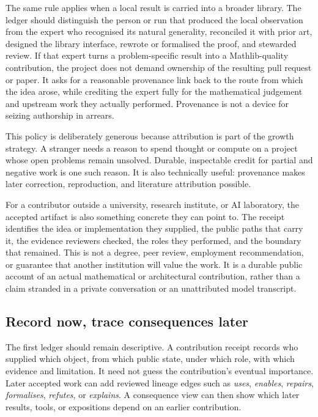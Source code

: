 \documentclass[10pt]{article}
\begin{document}
The same rule applies when a local result is carried into a broader library.
The ledger should distinguish the person or run that produced the local
observation from the expert who recognised its natural generality, reconciled
it with prior art, designed the library interface, rewrote or formalised the
proof, and stewarded review.  If that expert turns a problem-specific result
into a Mathlib-quality contribution, the project does not demand ownership of
the resulting pull request or paper.  It asks for a reasonable provenance
link back to the route from which the idea arose, while crediting the expert
fully for the mathematical judgement and upstream work they actually
performed.  Provenance is not a device for seizing authorship in arrears.

This policy is deliberately generous because attribution is part of the
growth strategy.  A stranger needs a reason to spend thought or compute on a
project whose open problems remain unsolved.  Durable, inspectable credit for
partial and negative work is one such reason.  It is also technically useful:
provenance makes later correction, reproduction, and literature attribution
possible.

For a contributor outside a university, research institute, or AI laboratory,
the accepted artifact is also something concrete they can point to.  The
receipt identifies the idea or implementation they supplied, the public paths
that carry it, the evidence reviewers checked, the roles they performed, and
the boundary that remained.  This is not a degree, peer review, employment
recommendation, or guarantee that another institution will value the work.
It is a durable public account of an actual mathematical or architectural
contribution, rather than a claim stranded in a private conversation or an
unattributed model transcript.

\subsection*{Record now, trace consequences later}

The first ledger should remain descriptive.  A contribution receipt records
who supplied which object, from which public state, under which role, with
which evidence and limitation.  It need not guess the contribution's eventual
importance.  Later accepted work can add reviewed lineage edges such as
\emph{uses}, \emph{enables}, \emph{repairs}, \emph{formalises}, \emph{refutes},
or \emph{explains}.  A consequence view can then show which later results,
tools, or expositions depend on an earlier contribution.
\end{document}
